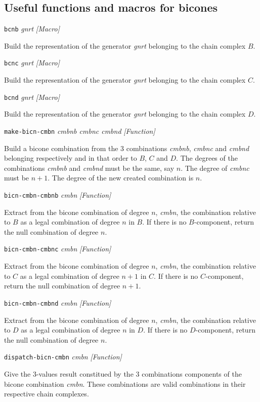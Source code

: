 \newpage

\subsection {Useful functions and macros for bicones}

{\parindent=0mm
{\leftskip=5mm 
{\tt bcnb} {\em gnrt} \hfill {\em [Macro]} \par}
{\leftskip=15mm 
Build the representation of the generator {\em gnrt} belonging to the chain complex
$B$. \par}{\leftskip=5mm 
{\tt bcnc} {\em gnrt} \hfill {\em [Macro]} \par}
{\leftskip=15mm 
Build the representation of the generator {\em gnrt} belonging to the chain complex
$C$. \par}{\leftskip=5mm 
{\tt bcnd} {\em gnrt} \hfill {\em [Macro]} \par}
{\leftskip=15mm 
Build the representation of the generator {\em gnrt} belonging to the chain complex
$D$. \par}
{\leftskip=5mm 
{\tt make-bicn-cmbn} {\em cmbnb cmbnc cmbnd} \hfill {\em [Function]} \par}
{\leftskip=15mm 
Build a bicone combination from the $3$ combinations {\em cmbnb}, {\em cmbnc} and {\em cmbnd} belonging
respectively and in that order to $B$, $C$ and $D$. The degrees of the combinations {\em cmbnb} and {\em cmbnd}
must be the same, say $n$. The degree of {\em cmbnc} must be $n+1$. The degree of the new created combination
is $n$. \par }
{\leftskip=5mm 
{\tt bicn-cmbn-cmbnb} {\em cmbn} \hfill {\em [Function]} \par}
{\leftskip=15mm 
Extract from the bicone combination of degree $n$, {\em cmbn}, the combination relative to $B$ as a legal combination
of degree $n$ in $B$. If there is no $B$-component, return the null combination of degree $n$. \par}
{\leftskip=5mm 
{\tt bicn-cmbn-cmbnc} {\em cmbn} \hfill {\em [Function]} \par}
{\leftskip=15mm 
Extract from the bicone combination of degree $n$, {\em cmbn}, the combination relative to $C$ as a legal combination
of degree $n+1$ in $C$. If there is no $C$-component, return the null combination of degree $n+1$. \par} 
{\leftskip=5mm 
{\tt bicn-cmbn-cmbnd} {\em cmbn} \hfill {\em [Function]} \par}
{\leftskip=15mm 
Extract from the bicone combination of degree $n$, {\em cmbn}, the combination relative to $D$ as a legal combination
of degree $n$ in $D$. If there is no $D$-component, return the null combination of degree $n$. \par}
{\leftskip=5mm 
{\tt dispatch-bicn-cmbn} {\em cmbn} \hfill {\em [Function]} \par}
{\leftskip=15mm 
Give the $3$-values result constitued by the $3$ combinations components of the bicone combination
{\em cmbn}. These combinations are valid combinations in their respective chain complexes. \par}
}

